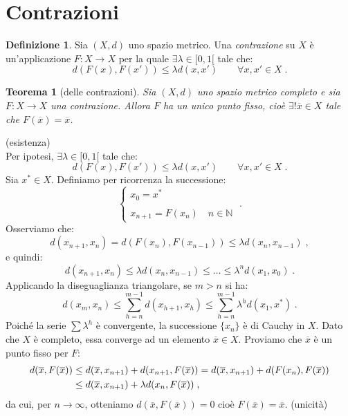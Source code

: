 \documentclass[a4paper,12pt]{report}
\theoremstyle{plain}
\newtheorem{thm}{Teorema}[section]
\theoremstyle{definition}
\newtheorem{defn}{Definizione}[section]
\theoremstyle{remark}
\numberwithin{equation}{section}
\begin{document}
\section{Contrazioni}
\begin{defn} Sia $(X,d)$ uno spazio metrico. Una \textit{contrazione} su $X$ è un'applicazione $F:X \to X$ per la quale $\exists \lambda \in [0,1[$ tale che:
\begin{equation}
d(F(x),F(x')) \le \lambda d(x,x') \qquad \forall x,x' \in X\;.
\end{equation}
\end{defn}
\begin{thm}[delle contrazioni] Sia $(X,d)$ uno spazio metrico completo e sia $F:X \to X$ una contrazione. Allora $F$ ha un unico punto fisso, cioè $\exists! \overline{x} \in X$ tale che $F(\overline{x})=\overline{x}$.
\end{thm}
\proof (esistenza) \\

Per ipotesi, $\exists \lambda \in [0,1[$ tale che:
\begin{equation}
d(F(x),F(x')) \le \lambda d(x,x') \qquad \forall x,x' \in X\;.
\end{equation}
Sia $x^* \in X$. Definiamo per ricorrenza la successione:
\begin{equation}
\begin{cases}
 x_0=x^* \\
 \\
x_{n+1}=F(x_n) \quad n \in \mathbb{N}
\end{cases}\;.
\end{equation}
Osserviamo che:
\begin{equation}
d(x_{n+1},x_n)=d(F(x_n),F(x_{n-1})) \le \lambda d(x_n,x_{n-1})\;,
\end{equation}
e quindi:
\begin{equation}
d(x_{n+1},x_n) \le \lambda d(x_n,x_{n-1}) \le \ldots \le \lambda^n d(x_1,x_0)\;.
\end{equation}
Applicando la diseguaglianza triangolare, se $m>n$ si ha:
\begin{equation}
d(x_m,x_n) \le \sum_{h=n}^{m-1} d(x_{h+1},x_h) \le \sum_{h=n}^{m-1} \lambda^h d(x_1,x^*)\;.
\end{equation}
Poiché la serie $\sum \lambda^h$ è convergente, la successione $\{x_n\}$ è di Cauchy in $X$. Dato che $X$ è completo, essa converge ad un elemento $\overline{x} \in X$. Proviamo che $\overline{x}$ è un punto fisso per $F$:
\begin{align}
d(\overline{x},F(\overline{x})) &\le d(\overline{x},x_{n+1})+d(x_{n+1},F(\overline{x}))=d(\overline{x},x_{n+1})+d(F(x_n),F(\overline{x})) \notag \\
&\le d(\overline{x},x_{n+1})+\lambda d(x_n,F(\overline{x}))\;,
\end{align}
da cui, per $n \to \infty$, otteniamo $d(\overline{x},F(\overline{x}))=0$ cioè $F(\overline{x})=\overline{x}$.
\endproof
\proof (unicità) \\
\end{document}

